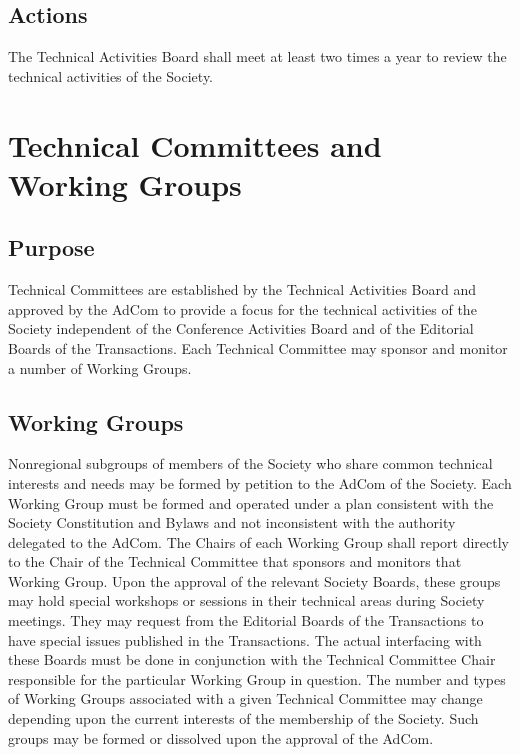 \documentclass[10pt]{article}
\begin{document}
\subsection{Actions}

The Technical Activities Board shall meet at least two times a year to review the technical activities of the Society. 


\section{Technical Committees and Working Groups}
\label{TCs}



\subsection{Purpose}
Technical Committees are established by the Technical Activities Board and approved by the AdCom to provide a focus for the technical activities of the Society independent of the Conference Activities Board and of the Editorial Boards of the Transactions. Each Technical Committee may sponsor and monitor a number of Working Groups.



\subsection{Working Groups}

Nonregional subgroups of members of the Society who share common technical interests and needs may be formed by petition to the AdCom of the Society. Each Working Group must be formed and operated under a plan consistent with the Society Constitution and Bylaws and not inconsistent with the authority delegated to the AdCom. The Chairs of each Working Group shall report directly to the Chair of the Technical Committee that sponsors and monitors that Working Group.  Upon the approval of the relevant Society Boards, these groups may hold special workshops or sessions in their technical areas during Society meetings. They may request from the Editorial Boards of the Transactions to have special issues published in the Transactions. The actual interfacing with these Boards must be done in conjunction with the Technical Committee Chair responsible for the particular Working Group in question. The number and types of Working Groups associated with a given Technical Committee may change depending upon the current interests of the membership of the Society.  Such groups may be formed or dissolved upon the approval of the AdCom.
\end{document}
